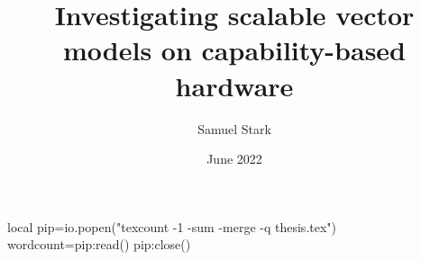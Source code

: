 
\title{Investigating scalable vector models on capability-based hardware}

\author{Samuel Stark}





\date{June 2022}

\begin{luacode*}
    local pip=io.popen("texcount -1 -sum -merge -q thesis.tex")
    wordcount=pip:read()
    pip:close()
\end{luacode*}

